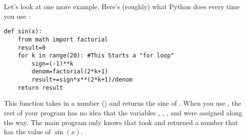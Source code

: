 Let's look at one more example.  Here's (roughly) what Python does every time you use :
\begin{Verbatim}
def sin(x):
    from math import factorial
    result=0
    for k in range(20): #This Starts a "for loop"
        sign=(-1)**k
        denom=factorial(2*k+1)
        result+=sign*x**(2*k+1)/denom
    return result
\end{Verbatim}
This function takes in a number () and returns the sine of .  When you use , the rest of your program has no idea that the variables , , , and  were assigned along the way.  The main program only knows that  took  and returned a number that has the value of $\sin(x)$.




